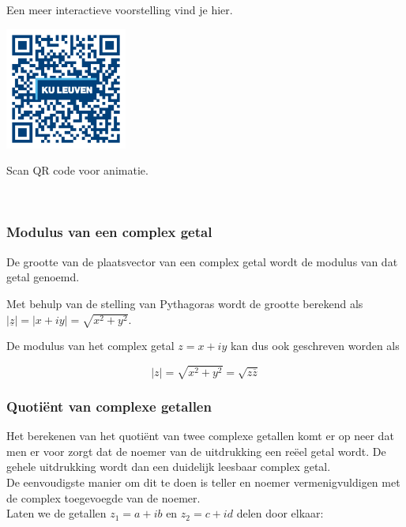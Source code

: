 
Een meer interactieve voorstelling vind je hier.\\

\begin{minipage}{.25\linewidth}
	\raggedright
	\includegraphics[width=4cm]{3_gonio_complexe_getallen/inputs/QR_Code_ANIMATIE3_module3new}
\end{minipage}
\begin{minipage}{.7\linewidth}
	Scan QR code voor animatie.
\end{minipage}  \\


\subsubsection{Modulus van een complex getal}

\begin{definitie}
	De grootte van de plaatsvector van een complex getal wordt de modulus van dat getal genoemd. 

\end{definitie}
Met behulp van de stelling van Pythagoras wordt de grootte berekend als $|\underline{z}|=|x+iy|=\sqrt{x^2 +y^2}$.\\
\begin{eigenschap}
	De modulus van het complex getal $z=x+iy$ kan dus ook geschreven worden als

\begin{framed}
\[ |z|=\sqrt{x^2 +y^2}=\sqrt{z \overline{z}}  \]
\end{framed}

\end{eigenschap}

\subsubsection{Quoti\"{e}nt van complexe getallen}

Het berekenen van het quoti\"{e}nt van twee complexe getallen komt er op neer dat men er voor zorgt dat de noemer van de uitdrukking een re\"{e}el getal wordt. De gehele uitdrukking wordt dan een duidelijk leesbaar complex getal.\\
De eenvoudigste manier om dit te doen is teller en noemer vermenigvuldigen met de complex toegevoegde van de noemer.\\
Laten we de getallen $z_{1}=a+ib$ en $z_{2}=c+id$ delen door elkaar:

